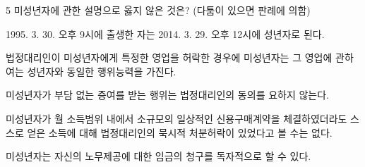 \begin{question}{5}
미성년자에 관한 설명으로 옳지 않은 것은? (다툼이 있으면 판례에 의함)
\begin{choices}
  \item 1995. 3. 30. 오후 9시에 출생한 자는 2014. 3. 29. 오후 12시에 성년자로 된다.
  \item 법정대리인이 미성년자에게 특정한 영업을 허락한 경우에 미성년자는 그 영업에 관하여는 성년자와 동일한 행위능력을 가진다.
  \item 미성년자가 부담 없는 증여를 받는 행위는 법정대리인의 동의를 요하지 않는다.
  \item 미성년자가 월 소득범위 내에서 소규모의 일상적인 신용구매계약을 체결하였더라도 스스로 얻은 소득에 대해 법정대리인의 묵시적 처분허락이 있었다고 볼 수는 없다.
  \item 미성년자는 자신의 노무제공에 대한 임금의 청구를 독자적으로 할 수 있다.
\end{choices}
\end{question}
